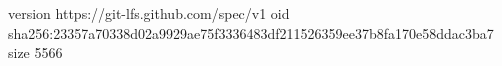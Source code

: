 version https://git-lfs.github.com/spec/v1
oid sha256:23357a70338d02a9929ae75f3336483df211526359ee37b8fa170e58ddac3ba7
size 5566
